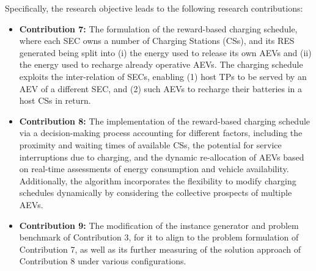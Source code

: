 Specifically, the research objective leads to the following research contributions:
\begin{itemize}
    \item \textbf{Contribution 7:} The formulation of the reward-based charging schedule, where each SEC owns a number of Charging Stations (CSs), and its RES generated being split into (i) the energy used to release its own AEVs and (ii) the energy used to recharge already operative AEVs. The charging schedule exploits the inter-relation of SECs, enabling (1) host TPs to be served by an AEV of a different SEC, and (2) such AEVs to recharge their batteries in a host CSs in return.

    \item \textbf{Contribution 8:} The implementation of the reward-based charging schedule via a decision-making process accounting for different factors, including the proximity and waiting times of available CSs, the potential for service interruptions due to charging, and the dynamic re-allocation of AEVs based on real-time assessments of energy
    consumption and vehicle availability. Additionally, the algorithm incorporates the
    flexibility to modify charging schedules dynamically by considering the collective
    prospects of multiple AEVs.

    \item \textbf{Contribution 9:} The modification of the instance generator and problem benchmark of Contribution 3, for it to align to the problem formulation of Contribution 7, as well as its further measuring of the solution approach of Contribution 8 under various configurations.    
\end{itemize}


    
